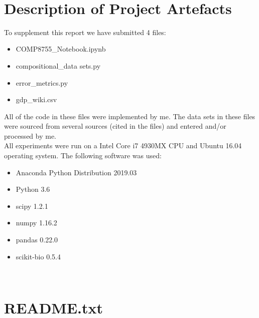 \documentclass[BSc]{usydthesis}
\numberwithin{equation}{chapter}
\theoremstyle{remark}
\begin{document}
\newpage
\
\section*{Description of Project Artefacts}
To supplement this report we have submitted 4 files:\\
\begin{itemize}
 \item COMP8755\_Notebook.ipynb \\
 \item compositional\_data sets.py \\
 \item error\_metrics.py \\
 \item gdp\_wiki.csv \\
\end{itemize}

All of the code in these files were implemented by me. The data sets in these files were sourced from several sources (cited in the files) and entered and/or processed by me.\\

All experiments were run on a Intel Core i7 4930MX CPU and Ubuntu 16.04 operating system. The following software was used:\\

\begin{itemize}
 \item Anaconda Python Distribution 2019.03\\
 \item Python 3.6\\
 \item scipy 1.2.1\\
 \item numpy 1.16.2\\
 \item pandas 0.22.0\\
 \item scikit-bio 0.5.4\\
 
\end{itemize}


\newpage
\

\section*{README.txt}
\end{document}
